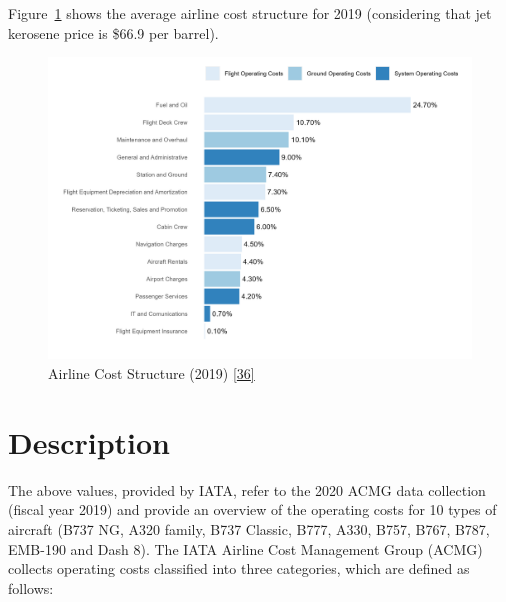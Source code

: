 \documentclass[
  11pt,
  a4paper,
]{book}
\begin{document}
Figure~\ref{fig-airline-costs-structure} shows the average airline cost
structure for 2019 (considering that jet kerosene price is \$66.9 per
barrel).

\begin{figure}

{\centering \includegraphics{chapters/../figures/Airline_cost_structure.png}

}

\caption{\label{fig-airline-costs-structure}Airline Cost Structure
(2019) \protect\hyperlink{ref-iata:cmg}{{[}36{]}}}

\end{figure}

\hypertarget{description-3}{%
\section{Description}\label{description-3}}

The above values, provided by IATA, refer to the 2020 ACMG data
collection (fiscal year 2019) and provide an overview of the operating
costs for 10 types of aircraft (B737 NG, A320 family, B737 Classic,
B777, A330, B757, B767, B787, EMB-190 and Dash 8). The IATA Airline Cost
Management Group (ACMG) collects operating costs classified into three
categories, which are defined as follows:
\end{document}
